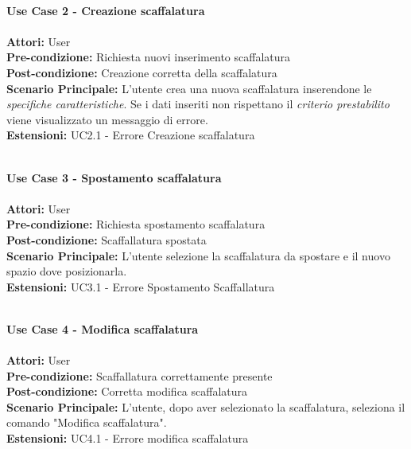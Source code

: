 \Large\textbf{}\\
\Large\textbf{Use Case 2 - Creazione scaffalatura} \\
\vspace{0.5cm}
\large\textbf{} \\
\textbf{Attori:} User\\
\textbf{Pre-condizione:} Richiesta nuovi inserimento scaffalatura \\
\textbf{Post-condizione: } Creazione corretta della scaffalatura\\
\textbf{Scenario Principale:}  L'utente crea una nuova scaffalatura inserendone le \textit{specifiche caratteristiche}. Se i dati inseriti non rispettano il \textit{criterio prestabilito} viene visualizzato un messaggio di errore.\\
\textbf{Estensioni: } UC2.1 - Errore Creazione scaffalatura\\
\vspace{0.5cm}

\Large\textbf{}\\
\Large\textbf{Use Case 3 - Spostamento scaffalatura} \\
\vspace{0.5cm}
\large\textbf{} \\
\textbf{Attori:} User\\
\textbf{Pre-condizione:} Richiesta spostamento scaffalatura \\
\textbf{Post-condizione: } Scaffallatura spostata \\
\textbf{Scenario Principale:}  L'utente selezione la scaffalatura da spostare e il nuovo spazio dove posizionarla.\\
\textbf{Estensioni: } UC3.1 - Errore Spostamento Scaffallatura\\
\vspace{0.5cm}

\Large\textbf{}\\
\Large\textbf{Use Case 4 - Modifica scaffalatura} \\
\vspace{0.5cm}
\large\textbf{} \\
\textbf{Attori:} User\\
\textbf{Pre-condizione:} Scaffallatura correttamente presente \\
\textbf{Post-condizione: } Corretta modifica scaffalatura\\
\textbf{Scenario Principale:}  L'utente, dopo aver selezionato la scaffalatura, seleziona il comando "Modifica scaffalatura". \\
\textbf{Estensioni: } UC4.1 - Errore modifica scaffalatura\\
\vspace{0.5cm}

